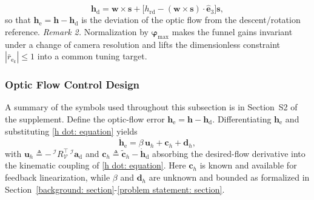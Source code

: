 \begin{equation} \label{h_d final: equation}
    \boldsymbol{h}_\text{d} = \boldsymbol{w}\times\boldsymbol{s} + \big[h_\text{rd} - (\boldsymbol{w}\times\boldsymbol{s})\cdot\hat{\boldsymbol{e}}_3\big]\boldsymbol{s},
\end{equation}
so that $\boldsymbol{h}_\text{e}=\boldsymbol{h}-\boldsymbol{h}_\text{d}$ is the deviation of the optic flow from the descent/rotation reference.
\textit{Remark 2.} Normalization by $\boldsymbol{\varphi}_\text{max}$ makes the funnel gains invariant under a change of camera resolution and lifts the dimensionless constraint $|\bar{r}_{\text{e}_k}|\le 1$ into a common tuning target.

\subsubsection{Optic Flow Control Design} \label{optic flow control: section}
A summary of the symbols used throughout this subsection is in Section~S2 of the supplement. Define the optic-flow error $\boldsymbol{h}_\text{e}=\boldsymbol{h}-\boldsymbol{h}_\text{d}$. Differentiating $\boldsymbol{h}_\text{e}$ and substituting \eqref{h dot: equation} yields
\begin{equation} \label{h_e_dot_1: equation}
    \dot{\boldsymbol{h}}_\text{e} = \beta\,\boldsymbol{u}_h + \boldsymbol{c}_h + \boldsymbol{d}_h,
\end{equation}
with $\boldsymbol{u}_h \triangleq -\,^\mathcal{I}R_\mathcal{V}^\top\,^\mathcal{I}\boldsymbol{a}_\text{d}$ and $\boldsymbol{c}_h \triangleq \tilde{\boldsymbol{c}}_h - \dot{\boldsymbol{h}}_\text{d}$ absorbing the desired-flow derivative into the kinematic coupling of \eqref{h dot: equation}. Here $\boldsymbol{c}_h$ is known and available for feedback linearization, while $\beta$ and $\boldsymbol{d}_h$ are unknown and bounded as formalized in Section~\ref{background: section}-\ref{problem statement: section}.

